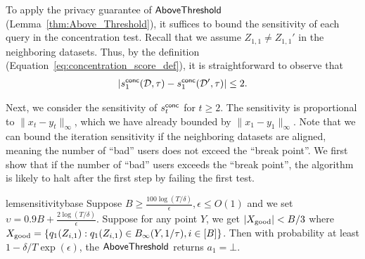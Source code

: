 To apply the privacy guarantee of $\mathsf{AboveThreshold}$  
(Lemma~\ref{thm:Above_Threshold}), it suffices to bound the sensitivity  
of each query in the concentration test.  
Recall that we assume $Z_{1,1} \neq Z_{1,1}'$ in the neighboring datasets.  
Thus, by the definition (Equation~\eqref{eq:concentration_score_def}), it is straightforward to observe that  
\begin{align}
\label{eq:query_sensitivity_qcon_one}
    |s^{\mathsf{conc}}_1(\mathcal{D}, \tau) - s^{\mathsf{conc}}_1(\mathcal{D}', \tau)| \le 2.  
\end{align}  

Next, we consider the sensitivity of $s^{\mathsf{conc}}_t$ for $t \ge 2$.  
The sensitivity is proportional to $\|x_t - y_t\|_\infty$, which we have  
already bounded by $\|x_1 - y_1\|_\infty$.  
Note that we can bound the iteration sensitivity if the neighboring  
datasets are aligned, meaning the number of ``bad'' users does not  
exceed the ``break point''. We first show that if the number of ``bad''  
users exceeds the ``break point'', the algorithm is likely to halt  
after the first step by failing the first test.


\begin{restatable}{lem}{sensitivitybase}
    \label{lm:sensitivity_base}
Suppose $B\ge \frac{100\log(T/\delta)}{\epsilon}, \epsilon\le O(1)$ and we set $\upsilon=0.9B+\frac{2\log(T/\delta)}{\epsilon}$.
Suppose for any point $Y$, we get $|X_{\mathrm{good}}|<B/3$ where $X_{\mathrm{good}}=\{q_1(Z_{i,1}):q_1(Z_{i,1})\in B_{\infty}(Y,1/\tau),i\in[B]\}$.
Then with probability at least $1-\delta/T\exp(\epsilon)$, the $\mathsf{AboveThreshold}$ returns $a_1=\bot$.
\end{restatable}







